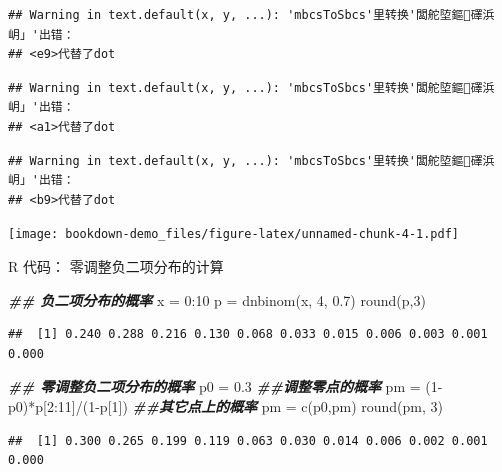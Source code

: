 \documentclass[
]{book}
\newenvironment{Shaded}{\begin{snugshade}}{\end{snugshade}}
\newcommand{\DecValTok}[1]{\textcolor[rgb]{0.00,0.00,0.81}{#1}}
\newcommand{\DocumentationTok}[1]{\textcolor[rgb]{0.56,0.35,0.01}{\textbf{\textit{#1}}}}
\newcommand{\FloatTok}[1]{\textcolor[rgb]{0.00,0.00,0.81}{#1}}
\newcommand{\FunctionTok}[1]{\textcolor[rgb]{0.00,0.00,0.00}{#1}}
\newcommand{\NormalTok}[1]{#1}
\newcommand{\OtherTok}[1]{\textcolor[rgb]{0.56,0.35,0.01}{#1}}
\newcommand{\SpecialCharTok}[1]{\textcolor[rgb]{0.00,0.00,0.00}{#1}}
\begin{document}
\begin{verbatim}
## Warning in text.default(x, y, ...): 'mbcsToSbcs'里转换'闆舵埅鏂礋浜岄」'出错：
## <e9>代替了dot
\end{verbatim}

\begin{verbatim}
## Warning in text.default(x, y, ...): 'mbcsToSbcs'里转换'闆舵埅鏂礋浜岄」'出错：
## <a1>代替了dot
\end{verbatim}

\begin{verbatim}
## Warning in text.default(x, y, ...): 'mbcsToSbcs'里转换'闆舵埅鏂礋浜岄」'出错：
## <b9>代替了dot
\end{verbatim}

\texttt{[image: bookdown-demo\_files/figure-latex/unnamed-chunk-4-1.pdf]}

R 代码： 零调整负二项分布的计算

\begin{Shaded}
\begin{Highlighting}[]
\DocumentationTok{\#\# 负二项分布的概率}
\NormalTok{x }\OtherTok{=} \DecValTok{0}\SpecialCharTok{:}\DecValTok{10}
\NormalTok{p }\OtherTok{=} \FunctionTok{dnbinom}\NormalTok{(x, }\DecValTok{4}\NormalTok{, }\FloatTok{0.7}\NormalTok{)}
\FunctionTok{round}\NormalTok{(p,}\DecValTok{3}\NormalTok{)}
\end{Highlighting}
\end{Shaded}

\begin{verbatim}
##  [1] 0.240 0.288 0.216 0.130 0.068 0.033 0.015 0.006 0.003 0.001 0.000
\end{verbatim}

\begin{Shaded}
\begin{Highlighting}[]
\DocumentationTok{\#\# 零调整负二项分布的概率}
\NormalTok{p0 }\OtherTok{=} \FloatTok{0.3}  \DocumentationTok{\#\#调整零点的概率}
\NormalTok{pm }\OtherTok{=}\NormalTok{ (}\DecValTok{1}\SpecialCharTok{{-}}\NormalTok{p0)}\SpecialCharTok{*}\NormalTok{p[}\DecValTok{2}\SpecialCharTok{:}\DecValTok{11}\NormalTok{]}\SpecialCharTok{/}\NormalTok{(}\DecValTok{1}\SpecialCharTok{{-}}\NormalTok{p[}\DecValTok{1}\NormalTok{])  }\DocumentationTok{\#\#其它点上的概率}
\NormalTok{pm }\OtherTok{=} \FunctionTok{c}\NormalTok{(p0,pm)}
\FunctionTok{round}\NormalTok{(pm, }\DecValTok{3}\NormalTok{)}
\end{Highlighting}
\end{Shaded}

\begin{verbatim}
##  [1] 0.300 0.265 0.199 0.119 0.063 0.030 0.014 0.006 0.002 0.001 0.000
\end{verbatim}
\end{document}
